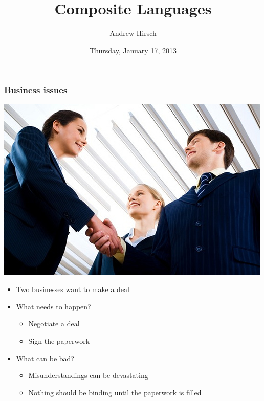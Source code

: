 \documentclass[bigger]{beamer}
\institute[GWU]{The George Washington University}
\title{Composite Languages}
\author{Andrew Hirsch}
\date{Thursday, January 17, 2013 }
\begin{document}
\maketitle


\begin{frame}
\frametitle{Business issues}
\label{sec-1}


\includegraphics[scale=0.25]{../pictures/business.jpg}

\begin{itemize}
\item Two businesses want to make a deal
\item What needs to happen?
\begin{itemize}
\item Negotiate a deal
\item Sign the paperwork
\end{itemize}
\item What can be bad?
\begin{itemize}
\item Misunderstandings can be devastating
\item Nothing should be binding until the paperwork is filled
\end{itemize}
\end{itemize}
\end{frame}
\end{document}
